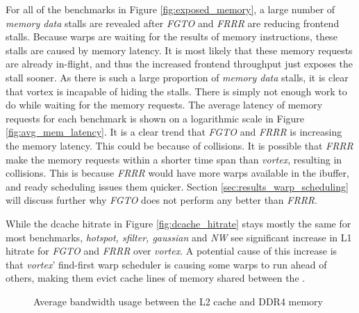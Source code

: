 For all of the benchmarks in Figure \ref{fig:exposed_memory}, a large number of \textit{memory data} stalls are revealed after \textit{FGTO} and \textit{FRRR} are reducing frontend stalls. Because warps are waiting for the results of memory instructions, these stalls are caused by memory latency. It is most likely that these memory requests are already in-flight, and thus the increased frontend throughput just exposes the stall sooner. As there is such a large proportion of \textit{memory data} stalls, it is clear that \Gls{vortex} is incapable of hiding the stalls. There is simply not enough  work to do while waiting for the memory requests. The average latency of memory requests for each benchmark is shown on a logarithmic scale in Figure \ref{fig:avg_mem_latency}. It is a clear trend that \textit{FGTO} and \textit{FRRR} is increasing the memory latency. This could be because of collisions. It is possible that \textit{FRRR} make the memory requests within a shorter time span than \textit{\Gls{vortex}}, resulting in collisions. This is because \textit{FRRR} would have more warps available in the ibuffer, and ready scheduling issues them quicker. Section \ref{sec:results_warp_scheduling} will discuss further why \textit{FGTO} does not perform any better than \textit{FRRR}.

While the dcache hitrate in Figure \ref{fig:dcache_hitrate} stays mostly the same for most benchmarks, \textit{hotspot, sfilter, gaussian} and \textit{NW} see significant increase in L1 hitrate for \textit{FGTO} and \textit{FRRR} over \textit{\Gls{vortex}}. A potential cause of this increase is that \textit{\Gls{vortex}}' find-first warp scheduler is causing some warps to run ahead of others, making them evict cache lines of memory shared between the . 

\begin{figure}
    \centering
    \caption[Average bandwidth usage between the L2 cache and main memory.]{Average bandwidth usage between the L2 cache and DDR4 memory}
    \label{fig:bandwidth_usage_l2}
\end{figure}

